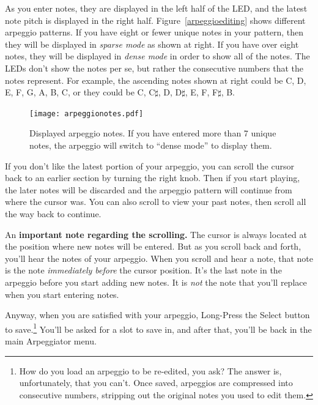 \documentclass{article}
\begin{document}
As you enter notes, they are displayed in the left half of the LED, and the latest note pitch is displayed in the right half. Figure~\ref{arpeggioediting} shows different arpeggio patterns.  If you have eight or fewer unique notes in your pattern, then they will be displayed in {\it sparse mode} as shown at right.  If you have over eight notes, they will be displayed in {\it dense mode} in order to show all of the notes.  The LEDs don't show the notes per se, but rather the consecutive numbers that the notes represent.  For example, the ascending notes shown at right could be C, D, E, F, G, A, B, C, or they could be C, C\(\sharp\), D, D\(\sharp\), E, F, F\(\sharp\), B.

\begin{figure}
\begin{center}
\vspace{-2.5em}
\texttt{[image: arpeggionotes.pdf]}\\
\end{center}
\vspace{-1em}\caption{Displayed arpeggio notes.  If you have entered more than 7 unique notes, the arpeggio will switch to ``dense mode'' to display them.}
\vspace{-1em}
\label{arpeggionotes}
\end{figure}

If you don't like the latest portion of your arpeggio, you can scroll the cursor back to an earlier section by turning the right knob.  Then if you start playing, the later notes will be discarded and the arpeggio pattern will continue from where the cursor was.  You can also scroll to view your past notes, then scroll all the way back to continue.

An {\bf important note regarding the scrolling.}  The cursor is always located at the position where new notes will be entered.  But as you scroll back and forth, you'll hear the notes of your arpeggio.  When you scroll and hear a note, that note is the note {\it immediately before} the cursor position.  It's the last note in the arpeggio before you start adding new notes. It is {\it not} the note that you'll replace when you start entering notes. 

Anyway, when you are satisfied with your arpeggio, Long-Press the Select button to save.\footnote{How do you load an arpeggio to be re-edited, you ask?  The answer is, unfortunately, that you can't.  Once saved, arpeggios are compressed into consecutive numbers, stripping out the original notes you used to edit them.}  You'll be asked for a slot to save in, and after that, you'll be back in the main Arpeggiator menu.
\end{document}
